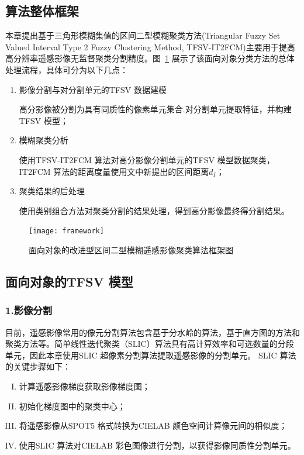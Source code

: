 \subsection{算法整体框架}
\label{subsec::chap03-3}
本章提出基于三角形模糊集值的区间二型模糊聚类方法(Triangular Fuzzy Set Valued Interval Type 2 Fuzzy Clustering Method, TFSV-IT2FCM)主要用于提高高分辨率遥感影像无监督聚类分割精度。图~\ref{fig:framework} 展示了该面向对象分类方法的总体处理流程，具体可分为以下几点：

\begin{enumerate}[Step 1:]
    \item 影像分割与对分割单元的TFSV 数据建模

          高分影像被分割为具有同质性的像素单元集合.对分割单元提取特征，并构建 TFSV 模型；
    \item 模糊聚类分析

          使用TFSV-IT2FCM 算法对高分影像分割单元的TFSV 模型数据聚类，IT2FCM 算法的距离度量使用文中新提出的区间距离$d_I$；
    \item 聚类结果的后处理

          使用类别组合方法对聚类分割的结果处理，得到高分影像最终得分割结果。
\end{enumerate}

\begin{figure}[htb]
    \centering
    \texttt{[image: framework]}
    \caption{面向对象的改进型区间二型模糊遥感影像聚类算法框架图}
    \label{fig:framework}
\end{figure}


\subsection{面向对象的TFSV 模型}
\label{subsec::chap03-3-1}

\subsubsection*{1.影像分割}
\label{subsec::chap03-3-1-1}

目前，遥感影像常用的像元分割算法包含基于分水岭的算法，基于直方图的方法和聚类方法等\cite{roerdink2000watershed}。简单线性迭代聚类（SLIC）算法具有高计算效率和可选数量的分段单元\cite{achanta2012slic}，因此本章使用SLIC 超像素分割算法提取遥感影像的分割单元。 SLIC 算法的关键步骤如下：
\begin{enumerate}[(I)]
    \item 计算遥感影像梯度获取影像梯度图；
    \item 初始化梯度图中的聚类中心；
    \item 将遥感影像从SPOT5 格式转换为CIELAB 颜色空间计算像元间的相似度；
    \item 使用SLIC 算法对CIELAB 彩色图像进行分割，以获得影像同质性分割单元。
\end{enumerate}

